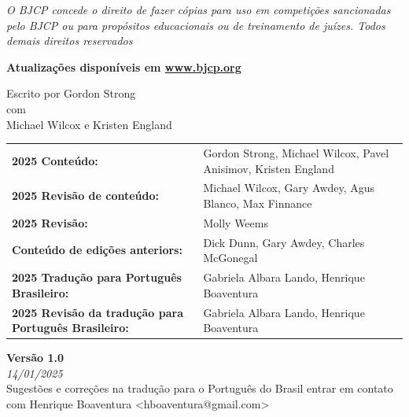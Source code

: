 \begin{titlepage}
        \vspace{0.3cm}

        {\fontsize{10}{32}\selectfont\textit{
            O BJCP concede o direito de fazer cópias para uso em competições sancionadas \break
            pelo BJCP ou para propósitos educacionais ou de treinamento de juízes.\break
            Todos demais direitos reservados
        }}\\

        \vspace{0.3cm}

        {\fontsize{12}{32}\selectfont \textbf{Atualizações disponíveis em \href{http://www.bjcp.org}{www.bjcp.org}}}\\

        \vspace{0.3cm}

        {\fontsize{12}{32}\selectfont Escrito por Gordon Strong}\\
        {\fontsize{9}{32}\selectfont com}\\
        {\fontsize{10}{32}\selectfont Michael Wilcox e Kristen England}\\

        \vspace{0.5cm}

        \begin{tabular}{ p{6.5cm} p{11.5cm} }
            \textbf{2025 Conteúdo:}	& Gordon Strong, Michael Wilcox, Pavel Anisimov, Kristen England \\
            \textbf{2025 Revisão de conteúdo:} & Michael Wilcox, Gary Awdey, Agus Blanco, Max Finnance \\
            \textbf{2025 Revisão:} & Molly Weems \\
            \textbf{Conteúdo de edições anteriors:} & Dick Dunn, Gary Awdey, Charles McGonegal \\
            \textbf{2025 Tradução para Português Brasileiro:} & Gabriela Albara Lando, Henrique Boaventura \\
            \textbf{2025 Revisão da tradução para Português Brasileiro:} & Gabriela Albara Lando, Henrique Boaventura
        \end{tabular}
        \vspace{0.5cm}
        \textbf{Versão 1.0}\\
        \footnotesize{\textit{14/01/2025}}\\
        \vspace{0.4cm}
        \footnotesize{Sugestões e correções na tradução para o Português do Brasil entrar em contato com Henrique Boaventura <hboaventura@gmail.com>}

\end{titlepage}

